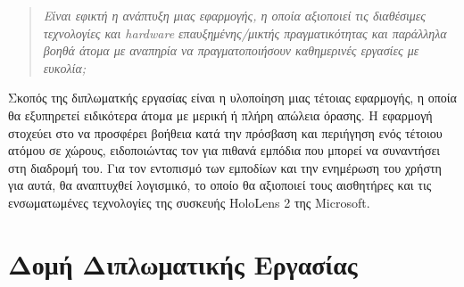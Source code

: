 \begin{quote}
    \textit{Είναι εφικτή η ανάπτυξη μιας εφαρμογής, η οποία  αξιοποιεί τις διαθέσιμες τεχνολογίες και hardware επαυξημένης/μικτής πραγματικότητας και παράλληλα βοηθά άτομα με αναπηρία να πραγματοποιήσουν καθημερινές εργασίες με ευκολία;}
\end{quote}
Σκοπός της διπλωματκής εργασίας είναι η υλοποίηση μιας τέτοιας εφαρμογής, η οποία θα εξυπηρετεί ειδικότερα άτομα με μερική ή πλήρη απώλεια όρασης. Η εφαρμογή στοχεύει στο να προσφέρει βοήθεια κατά την πρόσβαση και περιήγηση ενός τέτοιου ατόμου σε χώρους, ειδοποιώντας τον για πιθανά εμπόδια που μπορεί να συναντήσει στη διαδρομή του. Για τον εντοπισμό των εμποδίων και την ενημέρωση του χρήστη για αυτά, θα αναπτυχθεί λογισμικό, το οποίο θα αξιοποιεί τους αισθητήρες και τις ενσωματωμένες τεχνολογίες της συσκευής HoloLens 2 της Microsoft.

\section{Δομή Διπλωματικής Εργασίας}
